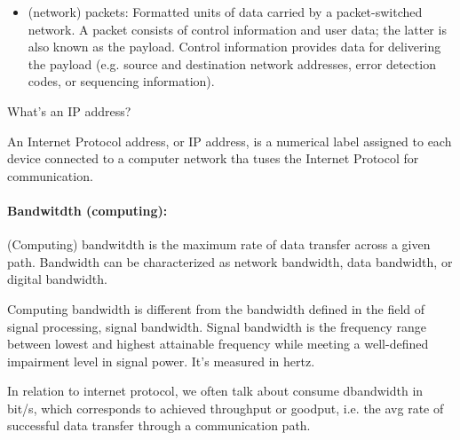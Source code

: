 \begin{itemize}
	\item (network) packets: Formatted units of data carried by a packet-switched network. A packet consists of control information and user data; the latter is also known as the payload. Control information provides data for delivering the payload (e.g. source and destination network addresses, error detection codes, or sequencing information).  
\end{itemize}

\begin{quest}
	\item What's an IP address?
	\begin{ans}
		An Internet Protocol address, or IP address, is a numerical label assigned to each device connected to a computer network tha tuses the Internet Protocol for communication. 
	\end{ans}
\end{quest}

\paragraph*{Bandwitdth (computing):} (Computing) bandwitdth is the maximum rate of data transfer across a given path. Bandwidth can be characterized as network bandwidth, data bandwidth, or digital bandwidth. 

Computing bandwidth is different from the bandwidth defined in the field of signal processing, signal bandwidth. Signal bandwidth is the frequency range between lowest and highest attainable frequency while meeting a well-defined impairment level in signal power. It's measured in hertz.

In relation to internet protocol, we often talk about consume dbandwidth in bit/s, which corresponds to achieved throughput or goodput, i.e. the avg rate of successful data transfer through a communication path. 


